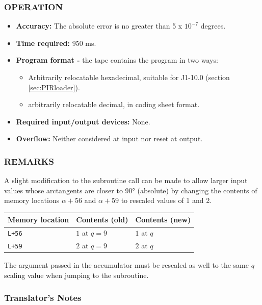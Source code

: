 \subsubsection*{OPERATION}
\begin{itemize}
    \item \textbf{Accuracy:} The absolute error is no greater than 5 x $10^{-7}$ degrees.
    \item \textbf{Time required:} 950 ms.
    \item \textbf{Program format -} the tape contains the program in two ways:
    \begin{itemize}
      \item Arbitrarily relocatable hexadecimal, suitable for J1-10.0 (section \ref{sec:PIRloader}).
        \item arbitrarily relocatable decimal, in coding sheet format.
    \end{itemize}
    \item \textbf{Required input/output devices:} None.
    \item \textbf{Overflow:} Neither considered at input nor reset at output.
\end{itemize}

\subsubsection*{REMARKS}
A slight modification to the subroutine call can be made to allow larger input values whose arctangents are closer to 90° (absolute) by changing the contents of memory locations $\alpha+56$ and $\alpha+59$ to rescaled values of 1 and 2.

\begin{center}
\begin{tabular}{lll}
    \toprule
    Memory location & Contents (old) & Contents (new) \\
    \midrule
    \texttt{L+56} & $1$ at $q=9$ & $1$ at $q$ \\
    \texttt{L+59} & $2$ at $q=9$ & $2$ at $q$ \\
    \bottomrule
\end{tabular}
\end{center}

The argument passed in the accumulator must be rescaled as well to the same $q$ scaling value when jumping to the subroutine.

\subsubsection*{Translator's Notes}
